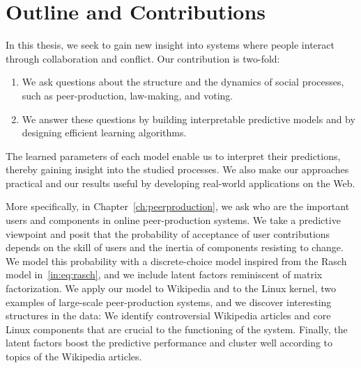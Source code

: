 \section{Outline and Contributions}
\label{in:sec:outline}

In this thesis, we seek to gain new insight into systems where people interact through collaboration and conflict.
Our contribution is two-fold:
\begin{enumerate}
	\item We ask questions about the structure and the dynamics of social processes, such as peer-production, law-making, and voting.
	\item We answer these questions by building interpretable predictive models and by designing efficient learning algorithms.
\end{enumerate}
The learned parameters of each model enable us to interpret their predictions, thereby gaining insight into the studied processes.
We also make our approaches practical and our results useful by developing real-world applications on the Web.


More specifically, in Chapter~\ref{ch:peerproduction}, we ask who are the important users and components in online peer-production systems.
We take a predictive viewpoint and posit that the probability of acceptance of user contributions depends on the skill of users and the inertia of components resisting to change.
We model this probability with a discrete-choice model inspired from the Rasch model in~\eqref{in:eq:rasch}, and we include latent factors reminiscent of matrix factorization.
We apply our model to Wikipedia and to the Linux kernel, two examples of large-scale peer-production systems, and we discover interesting structures in the data:
We identify controversial Wikipedia articles and core Linux components that are crucial to the functioning of the system.
Finally, the latent factors boost the predictive performance and cluster well according to topics of the Wikipedia articles.

